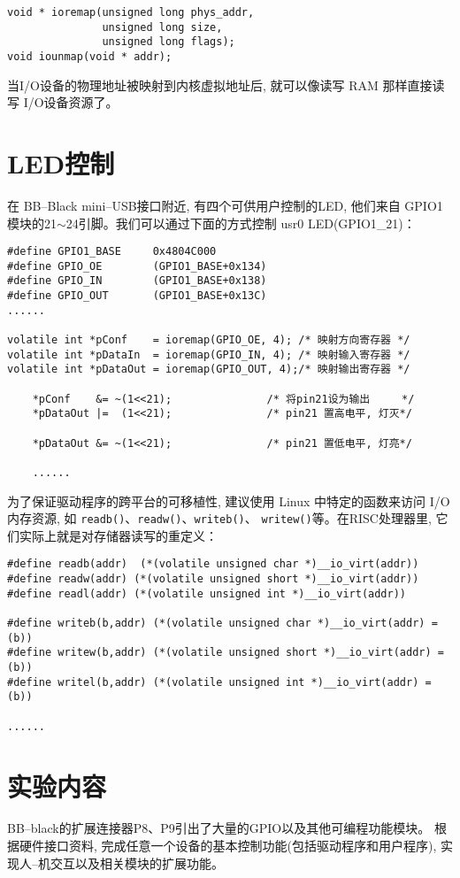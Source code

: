 \begin{lstlisting}
void * ioremap(unsigned long phys_addr,
               unsigned long size,
               unsigned long flags);
void iounmap(void * addr);
\end{lstlisting}

当I/O设备的物理地址被映射到内核虚拟地址后, 就可以像读写 RAM 那样直接读写
I/O设备资源了。

\section{LED控制}
在 BB--Black mini--USB接口附近, 有四个可供用户控制的LED, 他们来自
GPIO1模块的21$\sim$24引脚。我们可以通过下面的方式控制 usr0 LED(GPIO1\_21)：

\begin{lstlisting}
#define GPIO1_BASE     0x4804C000
#define GPIO_OE        (GPIO1_BASE+0x134)
#define GPIO_IN        (GPIO1_BASE+0x138)
#define GPIO_OUT       (GPIO1_BASE+0x13C)
......

volatile int *pConf    = ioremap(GPIO_OE, 4); /* 映射方向寄存器 */
volatile int *pDataIn  = ioremap(GPIO_IN, 4); /* 映射输入寄存器 */
volatile int *pDataOut = ioremap(GPIO_OUT, 4);/* 映射输出寄存器 */

    *pConf    &= ~(1<<21);               /* 将pin21设为输出     */
    *pDataOut |=  (1<<21);               /* pin21 置高电平, 灯灭*/

    *pDataOut &= ~(1<<21);               /* pin21 置低电平, 灯亮*/

    ......
\end{lstlisting}

为了保证驱动程序的跨平台的可移植性, 建议使用 Linux 中特定的函数来访问
I/O 内存资源, 如 \verb|readb()|、\verb|readw()|、\verb|writeb()|、
\verb|writew()|等。在RISC处理器里,
它们实际上就是对存储器读写的重定义：
\newpage
\begin{lstlisting}
#define readb(addr)  (*(volatile unsigned char *)__io_virt(addr))
#define readw(addr) (*(volatile unsigned short *)__io_virt(addr))
#define readl(addr) (*(volatile unsigned int *)__io_virt(addr))

#define writeb(b,addr) (*(volatile unsigned char *)__io_virt(addr) = (b))
#define writew(b,addr) (*(volatile unsigned short *)__io_virt(addr) = (b))
#define writel(b,addr) (*(volatile unsigned int *)__io_virt(addr) = (b))

......
\end{lstlisting}

\section{实验内容}
BB--black的扩展连接器P8、P9引出了大量的GPIO以及其他可编程功能模块。
根据硬件接口资料, 完成任意一个设备的基本控制功能(包括驱动程序和用户程序),
实现人--机交互以及相关模块的扩展功能。
